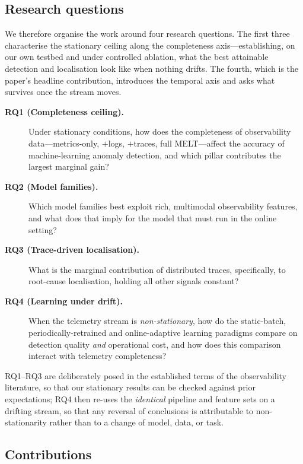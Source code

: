 \documentclass[acmsmall]{acmart}
\begin{document}
\subsection{Research questions}\label{sec:rqs}

We therefore organise the work around four research questions. The first three characterise the stationary ceiling along the completeness axis---establishing, on our own testbed and under controlled ablation, what the best attainable detection and localisation look like when nothing drifts. The fourth, which is the paper's headline contribution, introduces the temporal axis and asks what survives once the stream moves.

\begin{description}
  \item[\textbf{RQ1 (Completeness ceiling).}] Under stationary conditions, how does the completeness of observability data---metrics-only, ${+}$logs, ${+}$traces, full MELT---affect the accuracy of machine-learning anomaly detection, and which pillar contributes the largest marginal gain?
  \item[\textbf{RQ2 (Model families).}] Which model families best exploit rich, multimodal observability features, and what does that imply for the model that must run in the online setting?
  \item[\textbf{RQ3 (Trace-driven localisation).}] What is the marginal contribution of distributed traces, specifically, to root-cause localisation, holding all other signals constant?
  \item[\textbf{RQ4 (Learning under drift).}] When the telemetry stream is \emph{non-stationary}, how do the static-batch, periodically-retrained and online-adaptive learning paradigms compare on detection quality \emph{and} operational cost, and how does this comparison interact with telemetry completeness?
\end{description}

RQ1--RQ3 are deliberately posed in the established terms of the observability literature, so that our stationary results can be checked against prior expectations; RQ4 then re-uses the \emph{identical} pipeline and feature sets on a drifting stream, so that any reversal of conclusions is attributable to non-stationarity rather than to a change of model, data, or task.

\subsection{Contributions}\label{sec:contributions}
\end{document}
